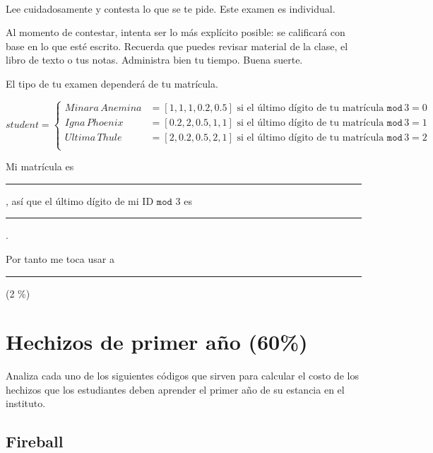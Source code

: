 \documentclass[11pt, onside]{article}
\title{
    \myclass \\
    \textbf{\mytitle} \\
    \myheader
    \date{}
}
\newcommand{\shortresponserule}{{\large\rule{5 cm}{0.3mm}}}
\begin{document}
\maketitle

\vspace{-1.5cm}

Lee cuidadosamente y contesta lo que se te pide.
Este examen es individual.

Al momento de contestar, intenta ser lo más explícito posible: se calificará con base en lo que esté escrito. %
Recuerda que puedes revisar material de la clase, el libro de texto o tus notas.
Administra bien tu tiempo.
Buena suerte.

\vspace{1.5ex}

El tipo de tu examen dependerá de tu matrícula.

$$ student = 
\begin{cases}
   Minara \, Anemina & = [1, 1, 1, 0.2, 0.5] \text{ si el último dígito de tu matrícula } \mathtt{mod} \, 3 = 0 \\
   Igna \, Phoenix & = [0.2, 2, 0.5, 1, 1] \text{ si el último dígito de tu matrícula } \mathtt{mod} \, 3 = 1 \\
   Ultima \, Thule & = [2, 0.2, 0.5, 2, 1] \text{ si el último dígito de tu matrícula } \mathtt{mod} \, 3 = 2 \\
\end{cases}
$$

\vspace{1.5ex}

Mi matrícula es \shortresponserule,
así que el último dígito de mi ID $\mathtt{mod}$ 3 es \rule{1cm}{0.4mm}.

Por tanto me toca usar a \shortresponserule \quad (2 \%)

\vspace{1.5ex}

\section{Hechizos de primer año (60\%)}

Analiza cada uno de los siguientes códigos que sirven para calcular el costo de los hechizos que los estudiantes deben aprender el primer año de su estancia en el instituto.

\subsection{Fireball}
\end{document}
